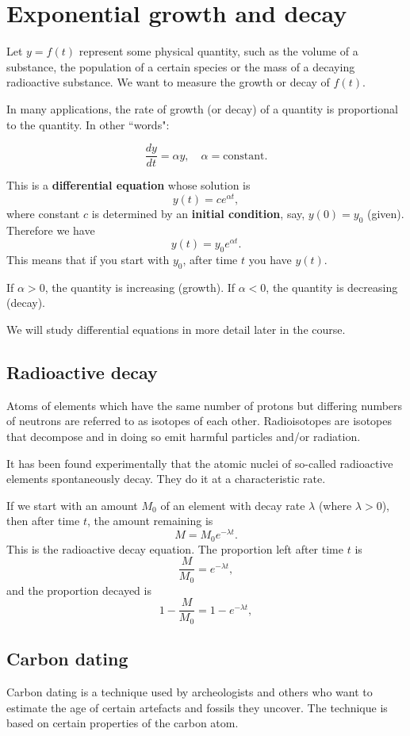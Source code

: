 \section{Exponential growth and decay}

Let $y=f(t)$ represent some physical quantity, such as the volume of a substance, the population of a certain species or the mass of a decaying radioactive substance. We want to measure the growth or decay of $f(t)$.

In many applications, the rate of growth (or decay) of a quantity is proportional to the quantity. In other ``words":

\[\frac{dy}{dt}=\alpha y,\quad \alpha=\text{constant}.\]

This is a \textbf{differential equation} whose solution is
\[y(t)=ce^{\alpha t},\]
where constant $c$ is determined by an \textbf{initial condition}, say, $y(0)=y_0$ (given). Therefore we have
\[y(t)=y_0e^{\alpha t}.\]
This means that if you start with $y_0$, after time $t$ you have $y(t)$.

If $\alpha>0$, the quantity is increasing (growth). If $\alpha<0$, the quantity is decreasing (decay).

We will study differential equations in more detail later in the course.

\subsection{Radioactive decay}
Atoms of elements which have the same number of protons but differing numbers of neutrons are referred to as isotopes of each other. Radioisotopes are isotopes that decompose and in doing so emit harmful particles and/or radiation.

It has been found experimentally that the atomic nuclei of so-called radioactive elements spontaneously decay. They do it at a characteristic rate.

If we start with an amount $M_0$ of an element with decay rate $\lambda$ (where $\lambda>0$), then after time $t$, the amount remaining is
\[M=M_0e^{-\lambda t}.\]
This is the radioactive decay equation. The proportion left after time $t$ is 
\[\frac{M}{M_0}=e^{-\lambda t},\]
and the proportion decayed is 
\[1-\frac{M}{M_0}=1-e^{-\lambda t},\]

\subsection{Carbon dating} 
Carbon dating is a technique used by archeologists and others who want to estimate the age of certain artefacts and fossils they uncover. The technique is based on certain properties of the carbon atom.

